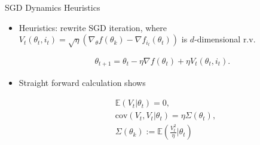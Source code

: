\documentclass[fleqn]{beamer}
\begin{document}
    \begin{frame}{SGD Dynamics Heuristics}
        \begin{itemize}
            \item Heuristics: rewrite SGD iteration, where $V_t(\theta_t, i_t) =
                \sqrt{\eta}\left(\nabla_\theta f(\theta_k) - \nabla
                f_{i_t}(\theta_t)  \right)  $ is $d$-dimensional r.v.
            \begin{center}
            \begin{minipage}{0.5\textwidth}
                \begin{align*}
                    \theta_{t+1} = \theta_t - \eta \nabla f(\theta_t) + \eta
                    V_t(\theta_t, i_t).
                \end{align*}
            \end{minipage}
            \end{center}

        \item Straight forward calculation shows
            \begin{center}
            \begin{minipage}{0.5\textwidth}
                \begin{align*}
                    &\mathbb{E}(V_t|\theta_t) = 0, \\
                    &\text{cov}(V_t, V_t|\theta_t) = \eta \Sigma(\theta_t), \\
                    &\Sigma(\theta_k) :=
                    \mathbb{E}\left(\frac{V_t^{2}}{\eta}\Big|\theta_t \right)
                \end{align*}
            \end{minipage}
            \end{center}
        \end{itemize}
    \end{frame}
\end{document}
